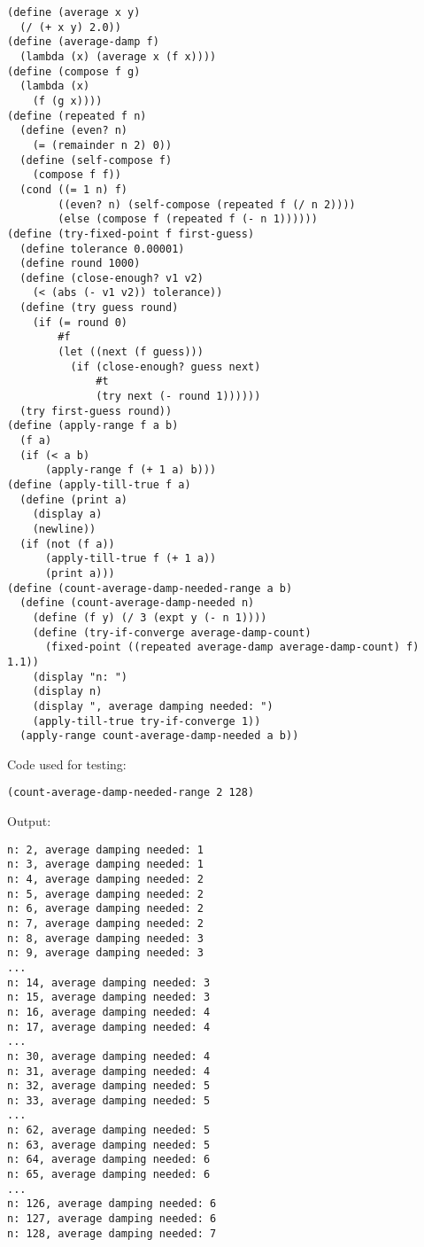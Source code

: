\documentclass[../main.tex]{subfiles}
\begin{document}
\begin{lstlisting}
(define (average x y)
  (/ (+ x y) 2.0))
(define (average-damp f)
  (lambda (x) (average x (f x))))
(define (compose f g)
  (lambda (x)
    (f (g x))))
(define (repeated f n)
  (define (even? n)
    (= (remainder n 2) 0))
  (define (self-compose f)
    (compose f f))
  (cond ((= 1 n) f)
        ((even? n) (self-compose (repeated f (/ n 2))))
        (else (compose f (repeated f (- n 1))))))
(define (try-fixed-point f first-guess)
  (define tolerance 0.00001)
  (define round 1000)
  (define (close-enough? v1 v2)
    (< (abs (- v1 v2)) tolerance))
  (define (try guess round)
    (if (= round 0)
        #f
        (let ((next (f guess)))
          (if (close-enough? guess next)
              #t
              (try next (- round 1))))))
  (try first-guess round))
(define (apply-range f a b)
  (f a)
  (if (< a b)
      (apply-range f (+ 1 a) b)))
(define (apply-till-true f a)
  (define (print a)
    (display a)
    (newline))
  (if (not (f a))
      (apply-till-true f (+ 1 a))
      (print a)))
(define (count-average-damp-needed-range a b)
  (define (count-average-damp-needed n)
    (define (f y) (/ 3 (expt y (- n 1))))
    (define (try-if-converge average-damp-count)
      (fixed-point ((repeated average-damp average-damp-count) f) 1.1))
    (display "n: ")
    (display n)
    (display ", average damping needed: ")
    (apply-till-true try-if-converge 1))
  (apply-range count-average-damp-needed a b))
\end{lstlisting}

Code used for testing:

\begin{lstlisting}
(count-average-damp-needed-range 2 128)
\end{lstlisting}

Output:

\begin{lstlisting}
n: 2, average damping needed: 1
n: 3, average damping needed: 1
n: 4, average damping needed: 2
n: 5, average damping needed: 2
n: 6, average damping needed: 2
n: 7, average damping needed: 2
n: 8, average damping needed: 3
n: 9, average damping needed: 3
...
n: 14, average damping needed: 3
n: 15, average damping needed: 3
n: 16, average damping needed: 4
n: 17, average damping needed: 4
...
n: 30, average damping needed: 4
n: 31, average damping needed: 4
n: 32, average damping needed: 5
n: 33, average damping needed: 5
...
n: 62, average damping needed: 5
n: 63, average damping needed: 5
n: 64, average damping needed: 6
n: 65, average damping needed: 6
...
n: 126, average damping needed: 6
n: 127, average damping needed: 6
n: 128, average damping needed: 7
\end{lstlisting}
\end{document}
